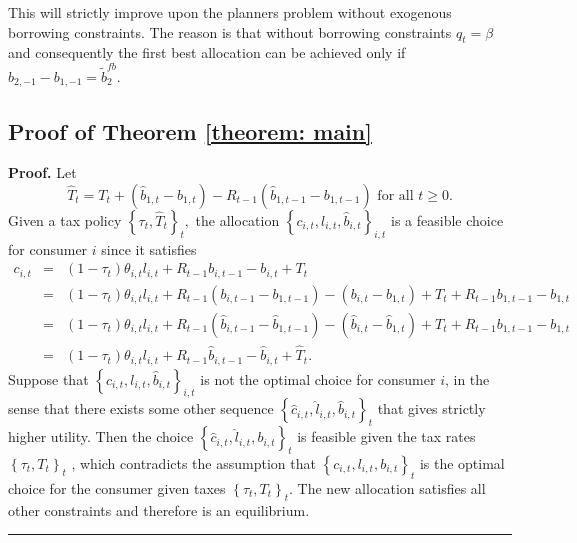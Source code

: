 \documentclass[thmsb,11pt]{article}
\newenvironment{proof}[1][Proof]{\noindent \textbf{#1.} }{\  \rule{0.5em}{0.5em}}
\begin{document}
This will strictly improve upon the planners problem without exogenous borrowing constraints. The reason is that without borrowing constraints $q_t=\beta$ and consequently the first best allocation  can be achieved only if $b_{2,-1}-b_{1,-1} = \tilde b_2^{fb}$.


\newpage

\subsection{Proof of Theorem \ref{theorem: main}}
\label{appndx: thm RE}
 \begin{proof}
 Let
 \begin{equation}
 \hat{T}_{t}=T_{t} + \left(\hat{b}_{1,t} - b_{1,t}\right) -
 R_{t-1}\left(\hat{b}_{1,t-1} - b_{1,t-1}\right) \text{ for
 all }t\geq 0.  \label{construct That}
 \end{equation}%
 Given  a tax policy $\left \{ \tau _{t},\hat{T}_{t}\right \} _{t},$ the
 allocation $\left \{ c_{i,t},l_{i,t},\hat{b}_{i,t}\right \}_{i,t}$ is a feasible choice for consumer $i$ since it satisfies%
 \begin{eqnarray*}
 c_{i,t}&=&\left( 1-\tau _{t}\right) \theta _{i,t}l_{i,t}+R_{t-1}b_{i,t-1}-b_{i,t}+T_{t}\\
 &=&\left( 1-\tau _{t}\right) \theta _{i,t}l_{i,t}+R_{t-1}\left( b_{i,t-1}-b_{1,t-1}\right) -\left(
 b_{i,t}-b_{1,t}\right) +T_{t}+R_{t-1}b_{1,t-1}-b_{1,t} \\
 &=&\left( 1-\tau _{t}\right) \theta _{i,t}l_{i,t}+R_{t-1}\left( \hat{b}_{i,t-1}-\hat{b}_{1,t-1}\right) -\left( \hat{b%
 }_{i,t}-\hat{b}_{1,t}\right) +T_{t}+R_{t-1}b_{1,t-1}-b_{1,t} \\
  &=&\left( 1-\tau _{t}\right) \theta
 _{i,t}l_{i,t}+R_{t-1}\hat{b}_{i,t-1}-\hat{b}_{i,t}+\hat{T}_{t}.
 \end{eqnarray*}%
 Suppose that $\left \{ c_{i,t},l_{i,t},\hat{b}_{i,t}\right \}_{i,t}$ is not the optimal choice for consumer $i$, in the sense that there exists some
 other sequence $\left \{ \hat{c}_{i,t},\hat{l}_{i,t},\hat{b}_{i,t}\right \}_{t}$ that gives strictly higher utility.  Then the choice $%
 \left \{ \hat{c}_{i,t},\hat{l}_{i,t},b_{i,t}\right \}_{t}$ is
 feasible given the tax rates  $\left \{ \tau _{t},T_{t}\right \} _{t}$%
 , which contradicts the assumption that $\left \{ c_{i,t},l_{i,t},b_{i,t}\right \}_{t}$ is the optimal choice for
 the consumer given taxes $\left \{ \tau _{t},T_{t}\right \}
 _{t}$. The new allocation satisfies all other constraints and
 therefore is an equilibrium.
 \end{proof}
\newpage
\end{document}

